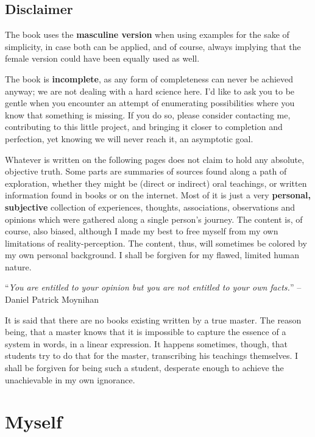 \subsection{Disclaimer}\label{subsec:disclaimer}

The book uses the \textbf{masculine version} when using examples for the sake of simplicity, in case both can be applied, and of course, always implying that the female version could have been equally used as well.

The book is \textbf{incomplete}, as any form of completeness can never be achieved anyway; we are not dealing with a hard science here.
I'd like to ask you to be gentle when you encounter an attempt of enumerating possibilities where you know that something is missing.
If you do so, please consider contacting me, contributing to this little project, and bringing it closer to completion and perfection, yet knowing we will never reach it, an asymptotic goal.

Whatever is written on the following pages does not claim to hold any absolute, objective truth.
Some parts are summaries of sources found along a path of exploration, whether they might be (direct or indirect) oral teachings, or written information found in books or on the internet.
Most of it is just a very \textbf{personal, subjective} collection of experiences, thoughts, associations, observations and opinions which were gathered along a single person's journey.
The content is, of course, also biased, although I made my best to free myself from my own limitations of reality-perception.
The content, thus, will sometimes be colored by my own personal background.
I shall be forgiven for my flawed, limited human nature.

\begin{displayquote}
    ``\textit{You are entitled to your opinion but you are not entitled to your own facts.}'' -- Daniel Patrick Moynihan
\end{displayquote}

It is said that there are no books existing written by a true master.
The reason being, that a master knows that it is impossible to capture the essence of a system in words, in a linear expression.
It happens sometimes, though, that students try to do that for the master, transcribing his teachings themselves.
I shall be forgiven for being such a student, desperate enough to achieve the unachievable in my own ignorance.

\section{Myself}\label{sec:myself}

